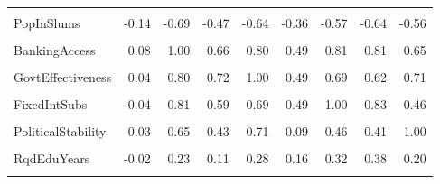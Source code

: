 \documentclass[
]{article}
\begin{document}
\begin{table}
{\begin{tabular}[t]{lrrrrrrrr}
\cellcolor{gray!10}{PopDensity} & \cellcolor{gray!10}{0.05} & \cellcolor{gray!10}{0.18} & \cellcolor{gray!10}{0.07} & \cellcolor{gray!10}{0.22} & \cellcolor{gray!10}{0.34} & \cellcolor{gray!10}{0.24} & \cellcolor{gray!10}{0.15} & \cellcolor{gray!10}{0.14}\\
PopInSlums & -0.14 & -0.69 & -0.47 & -0.64 & -0.36 & -0.57 & -0.64 & -0.56\\
\cellcolor{gray!10}{WaterStress} & \cellcolor{gray!10}{1.00} & \cellcolor{gray!10}{0.08} & \cellcolor{gray!10}{-0.08} & \cellcolor{gray!10}{0.04} & \cellcolor{gray!10}{0.05} & \cellcolor{gray!10}{-0.04} & \cellcolor{gray!10}{0.10} & \cellcolor{gray!10}{0.03}\\
BankingAccess & 0.08 & 1.00 & 0.66 & 0.80 & 0.49 & 0.81 & 0.81 & 0.65\\
\addlinespace
\cellcolor{gray!10}{RnDInvest} & \cellcolor{gray!10}{-0.08} & \cellcolor{gray!10}{0.66} & \cellcolor{gray!10}{1.00} & \cellcolor{gray!10}{0.72} & \cellcolor{gray!10}{0.46} & \cellcolor{gray!10}{0.59} & \cellcolor{gray!10}{0.49} & \cellcolor{gray!10}{0.43}\\
GovtEffectiveness & 0.04 & 0.80 & 0.72 & 1.00 & 0.49 & 0.69 & 0.62 & 0.71\\
\cellcolor{gray!10}{ShippingIndex} & \cellcolor{gray!10}{0.05} & \cellcolor{gray!10}{0.49} & \cellcolor{gray!10}{0.46} & \cellcolor{gray!10}{0.49} & \cellcolor{gray!10}{1.00} & \cellcolor{gray!10}{0.49} & \cellcolor{gray!10}{0.46} & \cellcolor{gray!10}{0.09}\\
FixedIntSubs & -0.04 & 0.81 & 0.59 & 0.69 & 0.49 & 1.00 & 0.83 & 0.46\\
\cellcolor{gray!10}{InternetUsersPct} & \cellcolor{gray!10}{0.10} & \cellcolor{gray!10}{0.81} & \cellcolor{gray!10}{0.49} & \cellcolor{gray!10}{0.62} & \cellcolor{gray!10}{0.46} & \cellcolor{gray!10}{0.83} & \cellcolor{gray!10}{1.00} & \cellcolor{gray!10}{0.41}\\
\addlinespace
PoliticalStability & 0.03 & 0.65 & 0.43 & 0.71 & 0.09 & 0.46 & 0.41 & 1.00\\
\cellcolor{gray!10}{RuleOfLaw} & \cellcolor{gray!10}{0.05} & \cellcolor{gray!10}{0.78} & \cellcolor{gray!10}{0.70} & \cellcolor{gray!10}{0.94} & \cellcolor{gray!10}{0.39} & \cellcolor{gray!10}{0.65} & \cellcolor{gray!10}{0.57} & \cellcolor{gray!10}{0.78}\\
RqdEduYears & -0.02 & 0.23 & 0.11 & 0.28 & 0.16 & 0.32 & 0.38 & 0.20\\
\cellcolor{gray!10}{GovtEduSpendPctGDP} & \cellcolor{gray!10}{0.06} & \cellcolor{gray!10}{0.36} & \cellcolor{gray!10}{0.32} & \cellcolor{gray!10}{0.27} & \cellcolor{gray!10}{-0.02} & \cellcolor{gray!10}{0.12} & \cellcolor{gray!10}{0.17} & \cellcolor{gray!10}{0.33}\\

\end{tabular}}
\end{table}
\end{document}
